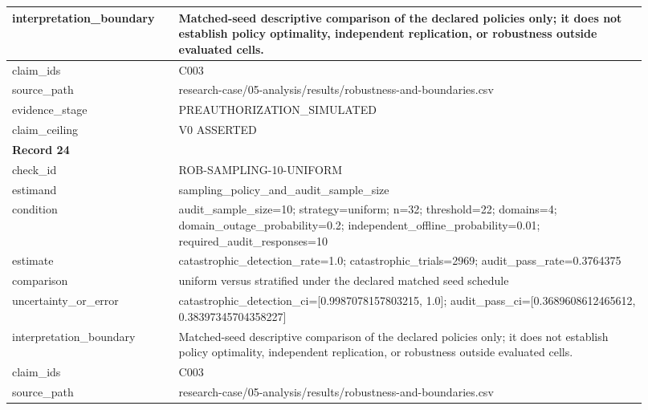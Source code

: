 \begin{longtable}{|p{0.24\linewidth}|p{0.68\linewidth}|}
interpretation\_\allowbreak{}boundary & Matched-seed descriptive comparison of the declared policies only;\allowbreak{} it does not establish policy optimality, independent replication, or robustness outside evaluated cells. \\ \hline
claim\_\allowbreak{}ids & C003 \\ \hline
source\_\allowbreak{}path & research-case/05-analysis/results/robustness-and-boundaries.csv \\ \hline
evidence\_\allowbreak{}stage & PREAUTHORIZATION\_\allowbreak{}SIMULATED \\ \hline
claim\_\allowbreak{}ceiling & V0 ASSERTED \\ \hline
\multicolumn{2}{|l|}{\textbf{Record 24}} \\ \hline
check\_\allowbreak{}id & ROB-SAMPLING-10-UNIFORM \\ \hline
estimand & sampling\_\allowbreak{}policy\_\allowbreak{}and\_\allowbreak{}audit\_\allowbreak{}sample\_\allowbreak{}size \\ \hline
condition & audit\_\allowbreak{}sample\_\allowbreak{}size=10;\allowbreak{} strategy=uniform;\allowbreak{} n=32;\allowbreak{} threshold=22;\allowbreak{} domains=4;\allowbreak{} domain\_\allowbreak{}outage\_\allowbreak{}probability=0.2;\allowbreak{} independent\_\allowbreak{}offline\_\allowbreak{}probability=0.01;\allowbreak{} required\_\allowbreak{}audit\_\allowbreak{}responses=10 \\ \hline
estimate & catastrophic\_\allowbreak{}detection\_\allowbreak{}rate=1.0;\allowbreak{} catastrophic\_\allowbreak{}trials=2969;\allowbreak{} audit\_\allowbreak{}pass\_\allowbreak{}rate=0.3764375 \\ \hline
comparison & uniform versus stratified under the declared matched seed schedule \\ \hline
uncertainty\_\allowbreak{}or\_\allowbreak{}error & catastrophic\_\allowbreak{}detection\_\allowbreak{}ci=[0.9987078157803215, 1.0];\allowbreak{} audit\_\allowbreak{}pass\_\allowbreak{}ci=[0.3689608612465612, 0.38397345704358227] \\ \hline
interpretation\_\allowbreak{}boundary & Matched-seed descriptive comparison of the declared policies only;\allowbreak{} it does not establish policy optimality, independent replication, or robustness outside evaluated cells. \\ \hline
claim\_\allowbreak{}ids & C003 \\ \hline
source\_\allowbreak{}path & research-case/05-analysis/results/robustness-and-boundaries.csv \\ \hline

\end{longtable}

